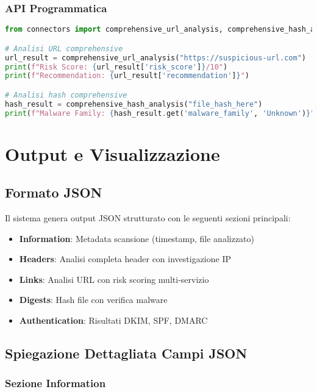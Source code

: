 \documentclass{article}
\begin{document}
\subsubsection{API Programmatica}
\begin{lstlisting}[language=Python, caption=Utilizzo programmatico]
from connectors import comprehensive_url_analysis, comprehensive_hash_analysis

# Analisi URL comprehensive
url_result = comprehensive_url_analysis("https://suspicious-url.com")
print(f"Risk Score: {url_result['risk_score']}/10")
print(f"Recommendation: {url_result['recommendation']}")

# Analisi hash comprehensive  
hash_result = comprehensive_hash_analysis("file_hash_here")
print(f"Malware Family: {hash_result.get('malware_family', 'Unknown')}")
\end{lstlisting}

\section{Output e Visualizzazione}

\subsection{Formato JSON}

Il sistema genera output JSON strutturato con le seguenti sezioni principali:

\begin{itemize}
    \item \textbf{Information}: Metadata scansione (timestamp, file analizzato)
    \item \textbf{Headers}: Analisi completa header con investigazione IP
    \item \textbf{Links}: Analisi URL con risk scoring multi-servizio
    \item \textbf{Digests}: Hash file con verifica malware
    \item \textbf{Authentication}: Risultati DKIM, SPF, DMARC
\end{itemize}

\subsection{Spiegazione Dettagliata Campi JSON}

\subsubsection{Sezione Information}
\end{document}
